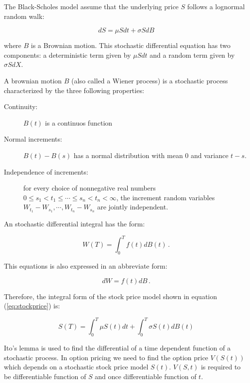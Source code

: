 The Black-Scholes model assume that the underlying price $S$ follows a lognormal random walk:

\begin{equation}\label{eq:stockprice}
dS = \mu S dt + \sigma S dB
\end{equation}

\noindent where $B$ is a Brownian motion. This stochastic differential equation
has two components: a deterministic term given by $\mu S dt$ and a random term
given by $\sigma S dX$.

A brownian motion $B$ (also called a Wiener process) is a stochastic process
characterized by the three following properties:

\begin{description}
\item[Continuity:] $B(t)$ is a continuos function
\item[Normal increments:]  $B(t)-B(s)$ has a normal distribution with mean $0$
and variance $t-s$.
\item[Independence of increments:] for every choice of nonnegative real numbers
$0 \leq s_1 <  t_1 \leq \cdots \leq s_n < t_n < \infty$, the increment random
variables $W_{t_1} - W_{s_1}, \cdots, W_{t_n} - W_{s_n}$ are jointly
independent.
\end{description}

An stochastic differential integral has the form:


\begin{equation}
W(T)=\int_0^T f(t)dB(t) \, .
\end{equation}

\noindent This equations is also expressed in an abbreviate form:

\begin{equation}
dW = f(t) dB \, .
\end{equation}

\noindent Therefore, the integral form of the stock price model shown in
equation (\ref{eq:stockprice}) is:

\begin{equation}
S(T)=\int_0^T \mu S(t) dt + \int_0^T \sigma S(t) dB(t)
\end{equation}


Ito's lemma is used to find the differential of a time dependent function of a
stochastic process. In option pricing we need to find the option price $V(S(t))$
which depends on a stochastic stock price model $S(t)$.  $V(S,t)$ is required to
be  differentiable function of $S$ and once differentiable function of $t$.

